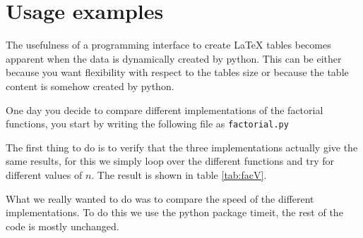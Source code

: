 \section{Usage examples}
The usefulness of a programming interface to create \LaTeX{}
tables becomes apparent when the data is dynamically created by python.
This can be either because you want flexibility with respect to the tables size
or because the table content is somehow created by python.

One day you decide to compare different implementations of the
factorial functions, you start by writing the following file
as \verb!factorial.py!


The first thing to do is to verify that the three implementations actually give
the same results, for this we simply loop over the different functions and try for
different values of $n$. The result is shown in table \ref{tab:facV}.



What we really wanted to do was to
compare the speed of the different implementations. To do this
we use the python package timeit, the rest of the code is mostly unchanged.



%
%
 
